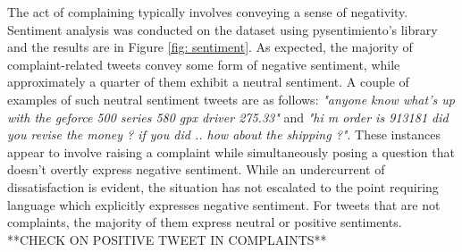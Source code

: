 The act of complaining typically involves conveying a sense of negativity. Sentiment analysis was conducted on the dataset using  pysentimiento's library \cite{perezPysentimientoPythonToolkit2021} and the results are in Figure \ref{fig: sentiment}. As expected, the majority of complaint-related tweets convey some form of negative sentiment, while approximately a quarter of them exhibit a neutral sentiment. A couple of examples of such neutral sentiment tweets are as follows: \textit{"anyone know what's up with the geforce 500 series 580 gpx driver 275.33"} and \textit{"hi m order is 913181 did you revise the money ? if you did .. how about the shipping ?"}. These instances appear to involve raising a complaint while simultaneously posing a question that doesn't overtly express negative sentiment. While an undercurrent of dissatisfaction is evident, the situation has not escalated to the point requiring language which explicitly expresses negative sentiment. For tweets that are not complaints, the majority of them express neutral or positive sentiments. **CHECK ON POSITIVE TWEET IN COMPLAINTS**

